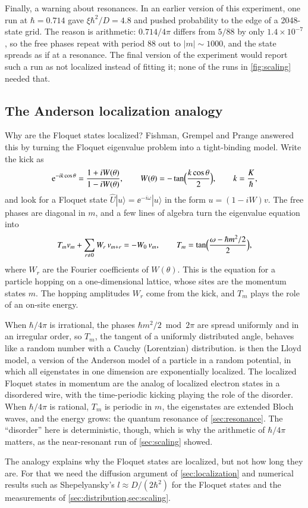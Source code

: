 Finally, a warning about resonances. In an earlier version of this experiment, one run at $\hbar = 0.714$
gave $\xi\hbar^2/D = 4.8$ and pushed probability to the edge of a 2048-state grid. The reason is arithmetic:
$0.714/4\pi$ differs from $5/88$ by only $1.4\times10^{-7}$, so the free phases repeat with period 88 out to
$|m| \sim 1000$, and the state spreads as if at a resonance. The final version of the experiment would report such a run as
not localized instead of fitting it; none of the runs in \cref{fig:scaling} needed that.

\subsection{The Anderson localization analogy}
\label{sec:anderson}

Why are the Floquet states localized? Fishman, Grempel and Prange \cite{Fishman1982} answered this by
turning the Floquet eigenvalue problem into a tight-binding model. Write the kick as
\begin{equation}
  \mathrm{e}^{-ik\cos\theta} = \frac{1 + iW(\theta)}{1 - iW(\theta)}, \qquad W(\theta) = -\tan\Bigl(\frac{k\cos\theta}{2}\Bigr),
  \qquad k = \frac{K}{\hbar},
\end{equation}
and look for a Floquet state $\hat U|u\rangle = \ee^{-i\omega}|u\rangle$ in the form $u = (1 - iW)v$. The free
phases are diagonal in $m$, and a few lines of algebra turn the eigenvalue equation into
\begin{equation}
  T_m v_m + \sum_{r\ne0} W_r\,v_{m+r} = -W_0\,v_m,
  \qquad T_m = \tan\Bigl(\frac{\omega - \hbar m^2/2}{2}\Bigr),
  \label{eq:anderson}
\end{equation}
where $W_r$ are the Fourier coefficients of $W(\theta)$. This is the equation for a particle hopping on a
one-dimensional lattice, whose sites are the momentum states $m$. The hopping amplitudes $W_r$ come from the
kick, and $T_m$ plays the role of an on-site energy.

When $\hbar/4\pi$ is irrational, the phases $\hbar m^2/2 \bmod 2\pi$ are spread uniformly and in an
irregular order, so $T_m$, the tangent of a uniformly distributed angle, behaves like a random number with a
Cauchy (Lorentzian) distribution.  is then the Lloyd model, a version of the Anderson model
of a particle in a random potential, in which all eigenstates in one dimension are exponentially localized.
The localized Floquet states in momentum are the analog of localized electron states in a disordered wire,
with the time-periodic kicking playing the role of the disorder. When $\hbar/4\pi$ is rational, $T_m$ is
periodic in $m$, the eigenstates are extended Bloch waves, and the energy grows: the quantum resonance of
\cref{sec:resonance}. The ``disorder'' here is deterministic, though, which is why the arithmetic of
$\hbar/4\pi$ matters, as the near-resonant run of \cref{sec:scaling} showed.

The analogy explains why the Floquet states are localized, but not how long they are. For that we need the
diffusion argument of \cref{sec:localization} and numerical results such as Shepelyansky's
$l \approx D/(2\hbar^2)$ for the Floquet states \cite{Shepelyansky1986} and the measurements of
\cref{sec:distribution,sec:scaling}.

